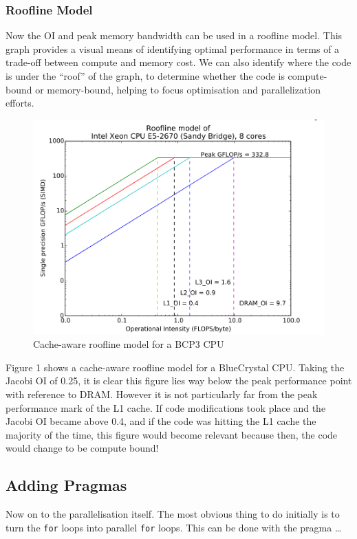 \documentclass{article}
\begin{document}
\subsubsection{Roofline Model}
Now the OI and peak memory bandwidth can be used in a roofline
model. This graph provides a visual means of identifying optimal
performance in terms of a trade-off between compute and memory
cost. We can also identify where the code is under the ``roof'' of the
graph, to determine whether the code is compute-bound or memory-bound,
helping to focus optimisation and parallelization efforts.

\begin{figure}
\captionsetup{justification=centering}
\centering
\includegraphics[scale=0.4]{roofline}
\caption{Cache-aware roofline model for a BCP3 CPU}
\end{figure}

Figure 1 shows a cache-aware roofline model for a BlueCrystal
CPU. Taking the Jacobi OI of 0.25, it is clear this figure lies way
below the peak performance point with reference to DRAM. However it is
not particularly far from the peak performance mark of the L1
cache. If code modifications took place and the Jacobi OI became above
0.4, and if the code was hitting the L1 cache the majority of the
time, this figure would become relevant because then, the code would
change to be compute bound!

\subsection{Adding Pragmas}
Now on to the parallelisation itself. The most obvious thing to do
initially is to turn the \texttt{for} loops into parallel \texttt{for}
loops. This can be done with the pragma \ldots
\end{document}
